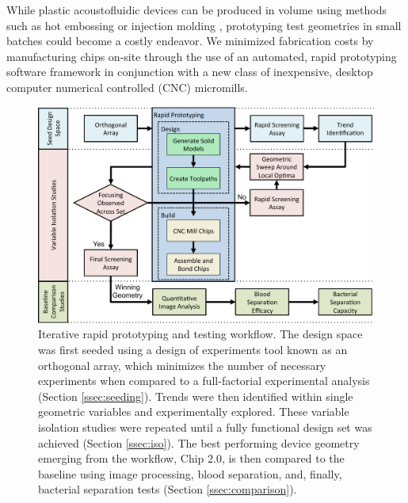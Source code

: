 While plastic acoustofluidic devices can be produced in volume using methods such as hot embossing or injection molding \cite{heckele2003review}, prototyping test geometries in small batches could become a costly endeavor.  We minimized fabrication costs by manufacturing chips on-site through the use of an automated, rapid prototyping software framework in conjunction with a new class of inexpensive, desktop computer numerical controlled (CNC) micromills.



\begin{figure}[htb]
  \begin{minipage}[t]{0.99\linewidth}\centering
    \includegraphics[width=14cm]{flow.pdf}
  \end{minipage}\hfill
  \caption[Rapid prototyping workflow]{Iterative rapid prototyping and testing workflow. The design space was first seeded using a design of experiments tool known as an orthogonal array, which minimizes the number of necessary experiments when compared to a full-factorial experimental analysis (Section \ref{ssec:seeding}). Trends were then identified within single geometric variables and experimentally explored. These variable isolation studies were repeated until a fully functional design set was achieved (Section \ref{ssec:iso}). The best performing device geometry emerging from the workflow, Chip 2.0, is then compared to the baseline using image processing, blood separation, and, finally, bacterial separation tests (Section \ref{ssec:comparison}).}
\label{fig:flow}       %
\end{figure}

